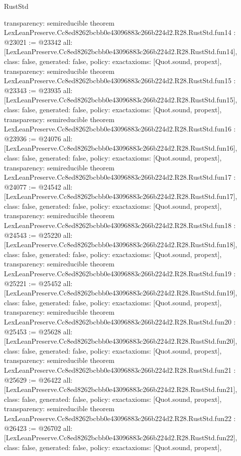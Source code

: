 \begin{lexlean}{RustStd}
\begin{coremodule}
{  transparency: semireducible
}
theorem LexLeanPreserve.Cc8ed8262bcbb0e43096883c266b224d2.R28.RustStd.fun14 : @23021 := @23342 {
  all: [LexLeanPreserve.Cc8ed8262bcbb0e43096883c266b224d2.R28.RustStd.fun14],
  class: false,
  generated: false,
  policy: exact{axioms: [Quot.sound, propext]},
  transparency: semireducible
}
theorem LexLeanPreserve.Cc8ed8262bcbb0e43096883c266b224d2.R28.RustStd.fun15 : @23343 := @23935 {
  all: [LexLeanPreserve.Cc8ed8262bcbb0e43096883c266b224d2.R28.RustStd.fun15],
  class: false,
  generated: false,
  policy: exact{axioms: [Quot.sound, propext]},
  transparency: semireducible
}
theorem LexLeanPreserve.Cc8ed8262bcbb0e43096883c266b224d2.R28.RustStd.fun16 : @23936 := @24076 {
  all: [LexLeanPreserve.Cc8ed8262bcbb0e43096883c266b224d2.R28.RustStd.fun16],
  class: false,
  generated: false,
  policy: exact{axioms: [Quot.sound, propext]},
  transparency: semireducible
}
theorem LexLeanPreserve.Cc8ed8262bcbb0e43096883c266b224d2.R28.RustStd.fun17 : @24077 := @24542 {
  all: [LexLeanPreserve.Cc8ed8262bcbb0e43096883c266b224d2.R28.RustStd.fun17],
  class: false,
  generated: false,
  policy: exact{axioms: [Quot.sound, propext]},
  transparency: semireducible
}
theorem LexLeanPreserve.Cc8ed8262bcbb0e43096883c266b224d2.R28.RustStd.fun18 : @24543 := @25220 {
  all: [LexLeanPreserve.Cc8ed8262bcbb0e43096883c266b224d2.R28.RustStd.fun18],
  class: false,
  generated: false,
  policy: exact{axioms: [Quot.sound, propext]},
  transparency: semireducible
}
theorem LexLeanPreserve.Cc8ed8262bcbb0e43096883c266b224d2.R28.RustStd.fun19 : @25221 := @25452 {
  all: [LexLeanPreserve.Cc8ed8262bcbb0e43096883c266b224d2.R28.RustStd.fun19],
  class: false,
  generated: false,
  policy: exact{axioms: [Quot.sound, propext]},
  transparency: semireducible
}
theorem LexLeanPreserve.Cc8ed8262bcbb0e43096883c266b224d2.R28.RustStd.fun20 : @25453 := @25628 {
  all: [LexLeanPreserve.Cc8ed8262bcbb0e43096883c266b224d2.R28.RustStd.fun20],
  class: false,
  generated: false,
  policy: exact{axioms: [Quot.sound, propext]},
  transparency: semireducible
}
theorem LexLeanPreserve.Cc8ed8262bcbb0e43096883c266b224d2.R28.RustStd.fun21 : @25629 := @26422 {
  all: [LexLeanPreserve.Cc8ed8262bcbb0e43096883c266b224d2.R28.RustStd.fun21],
  class: false,
  generated: false,
  policy: exact{axioms: [Quot.sound, propext]},
  transparency: semireducible
}
theorem LexLeanPreserve.Cc8ed8262bcbb0e43096883c266b224d2.R28.RustStd.fun22 : @26423 := @26702 {
  all: [LexLeanPreserve.Cc8ed8262bcbb0e43096883c266b224d2.R28.RustStd.fun22],
  class: false,
  generated: false,
  policy: exact{axioms: [Quot.sound, propext]},
}
\end{coremodule}
\end{lexlean}
